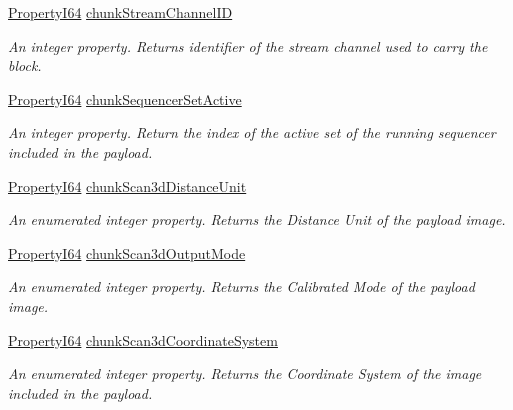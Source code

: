 \begin{DoxyCompactItemize}
\hyperlink{group___common_interface_ga81749b2696755513663492664a18a893}{Property\+I64} \hyperlink{classmv_i_m_p_a_c_t_1_1acquire_1_1_gen_i_cam_1_1_chunk_data_control_af31e8f39ddba15bdeb3c2199abbd3f32}{chunk\+Stream\+Channel\+I\+D}
\begin{DoxyCompactList}\small\item\em An integer property. Returns identifier of the stream channel used to carry the block. \end{DoxyCompactList}\item 
\hyperlink{group___common_interface_ga81749b2696755513663492664a18a893}{Property\+I64} \hyperlink{classmv_i_m_p_a_c_t_1_1acquire_1_1_gen_i_cam_1_1_chunk_data_control_a5c83ad3228ab5d5bc74603f8848961c5}{chunk\+Sequencer\+Set\+Active}
\begin{DoxyCompactList}\small\item\em An integer property. Return the index of the active set of the running sequencer included in the payload. \end{DoxyCompactList}\item 
\hyperlink{group___common_interface_ga81749b2696755513663492664a18a893}{Property\+I64} \hyperlink{classmv_i_m_p_a_c_t_1_1acquire_1_1_gen_i_cam_1_1_chunk_data_control_a4fb027191f957cc9e3884ba176e52562}{chunk\+Scan3d\+Distance\+Unit}
\begin{DoxyCompactList}\small\item\em An enumerated integer property. Returns the Distance Unit of the payload image. \end{DoxyCompactList}\item 
\hyperlink{group___common_interface_ga81749b2696755513663492664a18a893}{Property\+I64} \hyperlink{classmv_i_m_p_a_c_t_1_1acquire_1_1_gen_i_cam_1_1_chunk_data_control_a1b968c0335e50b8852709bc5d5cbcd93}{chunk\+Scan3d\+Output\+Mode}
\begin{DoxyCompactList}\small\item\em An enumerated integer property. Returns the Calibrated Mode of the payload image. \end{DoxyCompactList}\item 
\hyperlink{group___common_interface_ga81749b2696755513663492664a18a893}{Property\+I64} \hyperlink{classmv_i_m_p_a_c_t_1_1acquire_1_1_gen_i_cam_1_1_chunk_data_control_a2200e547f083391291827a35957d4b8d}{chunk\+Scan3d\+Coordinate\+System}
\begin{DoxyCompactList}\small\item\em An enumerated integer property. Returns the Coordinate System of the image included in the payload. \end{DoxyCompactList}\item 

\end{DoxyCompactItemize}
